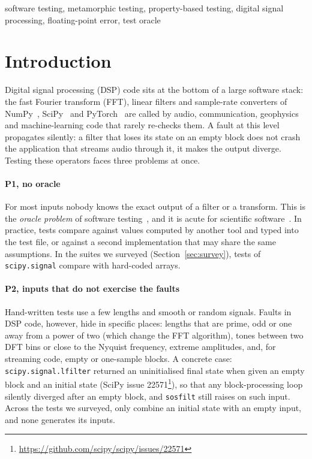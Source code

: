 \documentclass[10pt,conference]{IEEEtran}
\newcommand{\code}[1]{\texttt{#1}}
\begin{document}
\begin{IEEEkeywords}
software testing, metamorphic testing, property-based testing, digital signal processing, floating-point error, test oracle
\end{IEEEkeywords}

\section{Introduction}

Digital signal processing (DSP) code sits at the bottom of a large software
stack: the fast Fourier transform (FFT), linear filters and sample-rate
converters of NumPy~\cite{harris2020numpy}, SciPy~\cite{virtanen2020scipy} and
PyTorch~\cite{paszke2019pytorch} are called by audio, communication,
geophysics and machine-learning code that rarely re-checks them. A fault at
this level propagates silently: a filter that loses its state on an empty
block does not crash the application that streams audio through it, it makes
the output diverge. Testing these operators faces three problems at once.

\paragraph*{P1, no oracle} For most inputs nobody knows the exact output of a
filter or a transform. This is the \emph{oracle problem} of software
testing~\cite{barr2015oracle}, and it is acute for scientific
software~\cite{kanewala2014scientific}. In practice, tests compare against
values computed by another tool and typed into the test file, or against a
second implementation that may share the same assumptions. In the suites we
surveyed (Section~\ref{sec:survey}), \surveyScipyHardcoded{} tests of
\code{scipy.signal} compare with hard-coded arrays.

\paragraph*{P2, inputs that do not exercise the faults} Hand-written tests use
a few lengths and smooth or random signals. Faults in DSP code, however, hide in
specific places: lengths that are prime, odd or one away from a power of two
(which change the FFT algorithm), tones between two DFT bins or close to the
Nyquist frequency, extreme amplitudes, and, for streaming code, empty or
one-sample blocks. A concrete case: \code{scipy.signal.lfilter} returned an
uninitialised final state when given an empty block and an initial state
(SciPy issue 22571\footnote{\url{https://github.com/scipy/scipy/issues/22571}}),
so that any block-processing loop silently diverged after an empty block, and
\code{sosfilt} still raises on such input. Across the \surveyTotalTests{} tests
we surveyed, only \surveyZiEmpty{} combine an initial state with an empty
input, and none generates its inputs.
\end{document}
